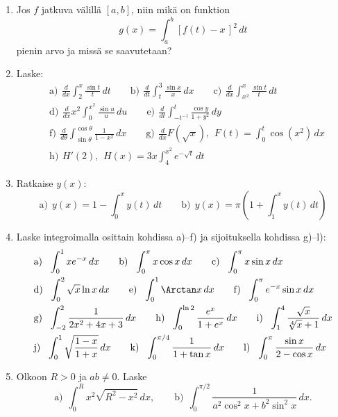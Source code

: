 \Harj
\begin{enumerate}

\item
Jos $f$ jatkuva välillä $[a,b]$, niin mikä on funktion
\[
g(x)=\int_a^b [f(t)-x\,]^2\,dt
\]
pienin arvo ja missä se saavutetaan?

\item
Laske:
\begin{align*}
&\text{a)}\,\ \frac{d}{dx}\int_2^x \frac{\sin t}{t}\,dt \qquad
 \text{b)}\,\ \frac{d}{dt}\int_t^3 \frac{\sin x}{x}\,dx \qquad
 \text{c)}\,\ \frac{d}{dx}\int_{x^2}^x \frac{\sin t}{t}\,dt \\
&\text{d)}\,\ \frac{d}{dx}x^2\int_0^{x^2} \frac{\sin u}{u}\,du \qquad
 \text{e)}\,\ \frac{d}{dt} \int_{-t^{-1}}^t \frac{\cos y}{1+y^2}\,dy \\
&\text{f)}\,\ \frac{d}{d\theta}\int_{\sin\theta}^{\cos\theta} \frac{1}{1-x^2}\,dx \qquad
 \text{g)}\,\ \frac{d}{dx}F(\sqrt{x}),\,\ F(t)=\int_0^t \cos(x^2)\,dx \\
&\text{h)}\,\ H'(2),\,\ H(x)=3x\int_4^{x^2} e^{-\sqrt{t}}\,dt
\end{align*}

\item
Ratkaise $y(x)$:
\[
\text{a)}\ \ y(x)=1-\int_0^x y(t)\,dt \qquad
\text{b)}\ \ y(x)=\pi\left(1+\int_1^x y(t)\,dt\right)
\]

\item
Laske integroimalla osittain kohdissa a)--f) ja sijoituksella kohdissa g)--l):
\begin{align*}
&\text{a)}\ \ \int_0^1 x e^{-x}\,dx \qquad
 \text{b)}\ \ \int_0^\pi x\cos x\,dx \qquad
 \text{c)}\ \ \int_0^\pi x\sin x\,dx \\
&\text{d)}\ \ \int_0^2 \sqrt{x}\ln x\,dx \qquad
 \text{e)}\ \ \int_0^1 \Arctan x\,dx \qquad
 \text{f)}\ \ \int_0^\pi e^{-x}\sin x\,dx \\
&\text{g)}\ \ \int_{-2}^2 \frac{1}{2x^2+4x+3}\,dx \qquad
 \text{h)}\ \ \int_0^{\ln 2} \frac{e^x}{1+e^x}\,dx \qquad
 \text{i)}\ \ \int_1^4 \frac{\sqrt{x}}{\sqrt[4]{x}+1}\,dx \\
&\text{j)}\ \ \int_0^1 \sqrt{\frac{1-x}{1+x}}\,dx \qquad
 \text{k)}\ \ \int_0^{\pi/4} \frac{1}{1+\tan x}\,dx \qquad
 \text{l)}\ \ \int_0^{\pi} \frac{\sin x}{2-\cos x}\,dx
\end{align*}

\item
Olkoon $R>0$ ja $ab \neq 0$. Laske
\[
\text{a)}\ \ \int_0^R x^2\sqrt{R^2-x^2}\,dx, \qquad
\text{b)}\ \ \int_0^{\pi/2} \frac{1}{a^2\cos^2 x+b^2\sin^2 x}\,dx.
\]


\end{enumerate}
